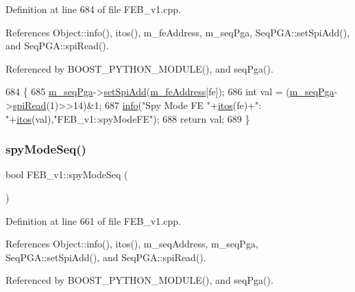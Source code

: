 Definition at line 684 of file F\+E\+B\+\_\+v1.\+cpp.



References Object\+::info(), itos(), m\+\_\+fe\+Address, m\+\_\+seq\+Pga, Seq\+P\+G\+A\+::set\+Spi\+Add(), and Seq\+P\+G\+A\+::spi\+Read().



Referenced by B\+O\+O\+S\+T\+\_\+\+P\+Y\+T\+H\+O\+N\+\_\+\+M\+O\+D\+U\+L\+E(), and seq\+Pga().


\begin{DoxyCode}
684                               \{
685   \hyperlink{classFEB__v1_a6c7804ac86796f233a8393043adf2e77}{m\_seqPga}->\hyperlink{classSeqPGA_ac998ce3a6d9b5f2e88cc8393f8c1df53}{setSpiAdd}(\hyperlink{classFEB__v1_a4e1945c2d5b434125f375e9d0fc6d99f}{m\_feAddress}[fe]);
686   \textcolor{keywordtype}{int} val = (\hyperlink{classFEB__v1_a6c7804ac86796f233a8393043adf2e77}{m\_seqPga}->\hyperlink{classSeqPGA_ab3d0e5e5d4014bc7a92588a76b8713d4}{spiRead}(1)>>14)&1;
687   \hyperlink{classObject_a644fd329ea4cb85f54fa6846484b84a8}{info}(\textcolor{stringliteral}{"Spy Mode FE "}+\hyperlink{Tools_8h_af330027dbdafb9a30768b3613c553e60}{itos}(fe)+\textcolor{stringliteral}{": "}+\hyperlink{Tools_8h_af330027dbdafb9a30768b3613c553e60}{itos}(val),\textcolor{stringliteral}{"FEB\_v1::spyModeFE"});
688   \textcolor{keywordflow}{return} val;
689 \}
\end{DoxyCode}
\mbox{\label{classFEB__v1_a3ec8b74aedfbe5e3d3ce0d4b4eb44330}} 
\subsubsection{\texorpdfstring{spy\+Mode\+Seq()}{spyModeSeq()}}
{\footnotesize\ttfamily bool F\+E\+B\+\_\+v1\+::spy\+Mode\+Seq (\begin{DoxyParamCaption}{ }\end{DoxyParamCaption})}



Definition at line 661 of file F\+E\+B\+\_\+v1.\+cpp.



References Object\+::info(), itos(), m\+\_\+seq\+Address, m\+\_\+seq\+Pga, Seq\+P\+G\+A\+::set\+Spi\+Add(), and Seq\+P\+G\+A\+::spi\+Read().



Referenced by B\+O\+O\+S\+T\+\_\+\+P\+Y\+T\+H\+O\+N\+\_\+\+M\+O\+D\+U\+L\+E(), and seq\+Pga().


